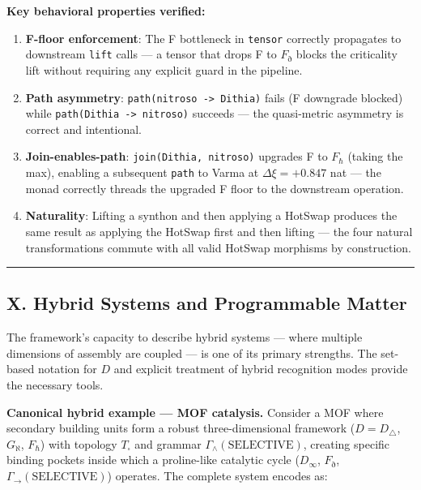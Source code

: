 \documentclass[12pt,a4paper]{article}
\begin{document}
\textbf{Key behavioral properties verified:}

\begin{enumerate}
    \item \textbf{F-floor enforcement}: The F bottleneck in \texttt{tensor} correctly propagates to downstream \texttt{lift} calls --- a tensor that drops F to $F_{\eth}$ blocks the criticality lift without requiring any explicit guard in the pipeline.
    \item \textbf{Path asymmetry}: \texttt{path(nitroso -\textgreater{} Dithia)} fails (F downgrade blocked) while \texttt{path(Dithia -\textgreater{} nitroso)} succeeds --- the quasi-metric asymmetry is correct and intentional.
    \item \textbf{Join-enables-path}: \texttt{join(Dithia, nitroso)} upgrades F to $F_{\hbar}$ (taking the max), enabling a subsequent \texttt{path} to Varma at $\Delta\xi = +0.847$ nat --- the monad correctly threads the upgraded F floor to the downstream operation.
    \item \textbf{Naturality}: Lifting a synthon and then applying a HotSwap produces the same result as applying the HotSwap first and then lifting --- the four natural transformations commute with all valid HotSwap morphisms by construction.
\end{enumerate}

\begin{center}
\rule{0.5\textwidth}{0.4pt}
\end{center}

\subsection{X. Hybrid Systems and Programmable Matter}

The framework's capacity to describe hybrid systems --- where multiple dimensions of assembly are coupled --- is one of its primary strengths. The set-based notation for $D$ and explicit treatment of hybrid recognition modes provide the necessary tools.

\textbf{Canonical hybrid example --- MOF catalysis.} Consider a MOF where secondary building units form a robust three-dimensional framework ($D = D_{\bigtriangleup}$, $G_{\aleph}$, $F_{\hbar}$) with topology $T_{\square}$ and grammar $\Gamma_{\wedge}(\text{SELECTIVE})$, creating specific binding pockets inside which a proline-like catalytic cycle ($D_{\infty}$, $F_{\eth}$, $\Gamma_{\to}(\text{SELECTIVE})$) operates. The complete system encodes as:
\end{document}
